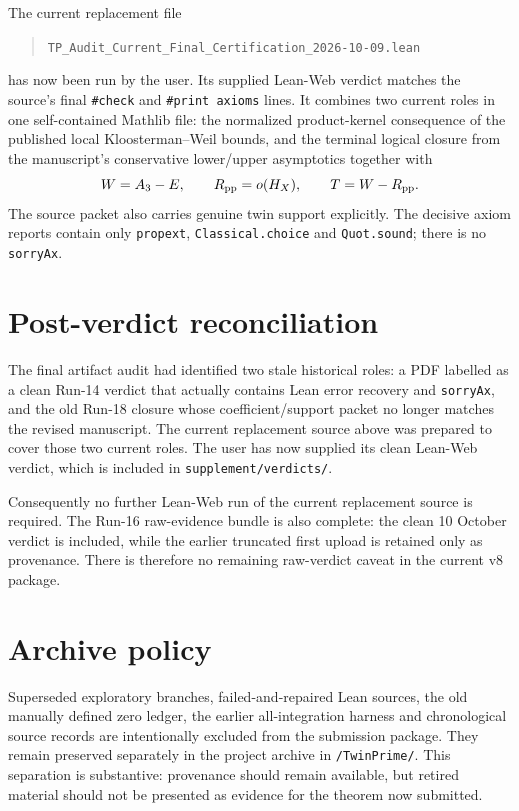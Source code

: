 \documentclass[11pt]{article}
\newcommand{\code}[1]{\texttt{#1}}
\begin{document}
The current replacement file
\begin{quote}
\code{TP\_Audit\_Current\_Final\_Certification\_2026-10-09.lean}
\end{quote}
has now been run by the user.  Its supplied Lean-Web verdict matches the source's final \code{\#check} and \code{\#print axioms} lines.  It combines two current roles in one self-contained Mathlib file: the normalized product-kernel consequence of the published local Kloosterman--Weil bounds, and the terminal logical closure from the manuscript's conservative lower/upper asymptotics together with
\[
 W=A_3-E,\qquad R_{\rm pp}=o(H_X),\qquad T=W-R_{\rm pp}.
\]
The source packet also carries genuine twin support explicitly.  The decisive axiom reports contain only \code{propext}, \code{Classical.choice} and \code{Quot.sound}; there is no \code{sorryAx}.

\section{Post-verdict reconciliation}
The final artifact audit had identified two stale historical roles: a PDF labelled as a clean Run-14 verdict that actually contains Lean error recovery and \code{sorryAx}, and the old Run-18 closure whose coefficient/support packet no longer matches the revised manuscript.  The current replacement source above was prepared to cover those two current roles.  The user has now supplied its clean Lean-Web verdict, which is included in \code{supplement/verdicts/}.

Consequently no further Lean-Web run of the current replacement source is required.  The Run-16 raw-evidence bundle is also complete: the clean 10 October verdict is included, while the earlier truncated first upload is retained only as provenance.  There is therefore no remaining raw-verdict caveat in the current v8 package.

\section{Archive policy}
Superseded exploratory branches, failed-and-repaired Lean sources, the old manually defined zero ledger, the earlier all-integration harness and chronological source records are intentionally excluded from the submission package.  They remain preserved separately in the project archive in \code{/TwinPrime/}.  This separation is substantive: provenance should remain available, but retired material should not be presented as evidence for the theorem now submitted.
\end{document}
